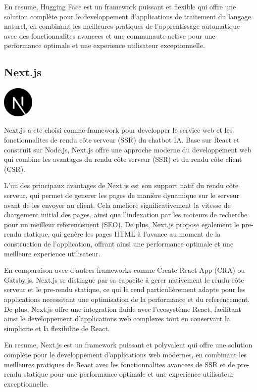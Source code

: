 \documentclass[a4paper, 11pt, openany]{report}
\begin{document}
En resume, Hugging Face est un framework puissant et flexible qui offre une solution complète pour le developpement d'applications de traitement du langage naturel, en combinant les meilleures pratiques de l'apprentissage automatique avec des fonctionnalites avancees et une communaute active pour une performance optimale et une experience utilisateur exceptionnelle.



\subsection{Next.js}
\begin{center}
\includegraphics[height=1.5cm]{images/next.png}
\end{center}

Next.js a ete choisi comme framework pour developper le service web et les fonctionnalites de rendu côte serveur (SSR) du chatbot IA. Base sur React et construit sur Node.js, Next.js offre une approche moderne du developpement web qui combine les avantages du rendu côte serveur (SSR) et du rendu côte client (CSR). 

L'un des principaux avantages de Next.js est son support natif du rendu côte serveur, qui permet de generer les pages de manière dynamique sur le serveur avant de les envoyer au client. Cela ameliore significativement la vitesse de chargement initial des pages, ainsi que l'indexation par les moteurs de recherche pour un meilleur referencement (SEO). De plus, Next.js propose egalement le pre-rendu statique, qui genère les pages HTML à l'avance au moment de la construction de l'application, offrant ainsi une performance optimale et une meilleure experience utilisateur.

En comparaison avec d'autres frameworks comme Create React App (CRA) ou Gatsby.js, Next.js se distingue par sa capacite à gerer nativement le rendu côte serveur et le pre-rendu statique, ce qui le rend particulièrement adapte pour les applications necessitant une optimisation de la performance et du referencement. De plus, Next.js offre une integration fluide avec l'ecosystème React, facilitant ainsi le developpement d'applications web complexes tout en conservant la simplicite et la flexibilite de React.

En resume, Next.js est un framework puissant et polyvalent qui offre une solution complète pour le developpement d'applications web modernes, en combinant les meilleures pratiques de React avec les fonctionnalites avancees de SSR et de pre-rendu statique pour une performance optimale et une experience utilisateur exceptionnelle.
\end{document}
